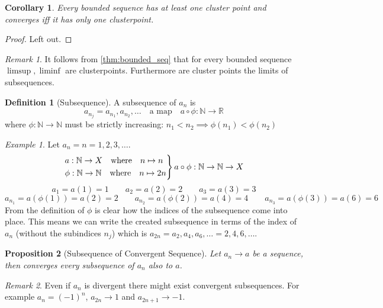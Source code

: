 \documentclass[english,titlepage]{uzhpub}
\theoremstyle{definition}
\newtheorem{definition}{Definition}[section]
\theoremstyle{plain}
\newtheorem{proposition}[definition]{Proposition}
\newtheorem{corollary}{Corollary}[theorem]
\theoremstyle{remark}
\newtheorem*{remark}{Remark}
\theoremstyle{example}
\newtheorem*{example}{Example}
\begin{document}
   \begin{corollary}\label{cor:bounded_subsequence_cluster_point}
      Every bounded sequence has at least one cluster point and converges iff it has only one clusterpoint.
   \end{corollary}
   \begin{proof}
      Left out.
   \end{proof}
   \begin{remark}
      It follows from \cref{thm:bounded_seq} that for every bounded sequence \(\limsup, \liminf\) are clusterpoints.
      Furthermore are cluster points the limits of subsequences.
   \end{remark}

   \begin{definition}[Subsequence]
      A subsequence of \(a_n\) is
      \[a_{n_j} = a_{n_1}, a_{n_2}, \ldots \quad\text{a map}\quad a \circ \phi: \mathbb{N} \to \mathbb{R}\]
      where \(\phi: \mathbb{N} \to \mathbb{N}\) must be strictly increasing: \(n_1 < n_2 \implies \phi(n_1) < \phi(n_2)\)
   \end{definition}
   \begin{example}
      Let \(a_n = n = 1, 2, 3, \ldots\).
      \[\begin{drcases}
            a: \mathbb{N} \to X \quad\text{where}\quad n \mapsto n \\
            \phi: \mathbb{N} \to \mathbb{N} \quad\text{where}\quad n \mapsto 2n
      \end{drcases} a \circ \phi: \mathbb{N} \to \mathbb{N} \to X\]
      \[a_1 = a(1) = 1 \qquad a_2 = a(2) = 2 \qquad a_3 = a(3) = 3\]
      \[a_{n_1} = a(\phi(1)) = a(2) = 2 \qquad a_{n_2} = a(\phi(2)) = a(4) = 4 \qquad a_{n_3} = a(\phi(3)) = a(6) = 6\]
      From the definition of \(\phi\) is clear how the indices of the subsequence come into place.
      This means we can write the created subsequence in terms of the index of \(a_n\) (without the subindices \(n_j\)) which is \(a_{2n} = a_2, a_4, a_6, \ldots = 2, 4, 6, \ldots\).
   \end{example}

   \begin{proposition}[Subsequence of Convergent Sequence]\label{pro:subseq_conv}
      Let \(a_n \to a\) be a sequence, then converges every subsequence of \(a_n\) also to \(a\).
   \end{proposition}
   \begin{remark}
      Even if \(a_n\) is divergent there might exist convergent subsequences.
      For example \(a_n = (-1)^n\), \(a_{2n} \to 1\) and \(a_{2n+1} \to -1\).
   \end{remark}
\end{document}
